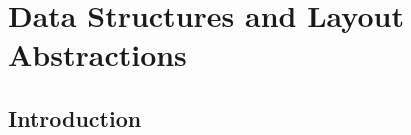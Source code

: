 \chapter{Data Structures and Layout Abstractions}
\label{ch:datastructures}





\section{Introduction}

